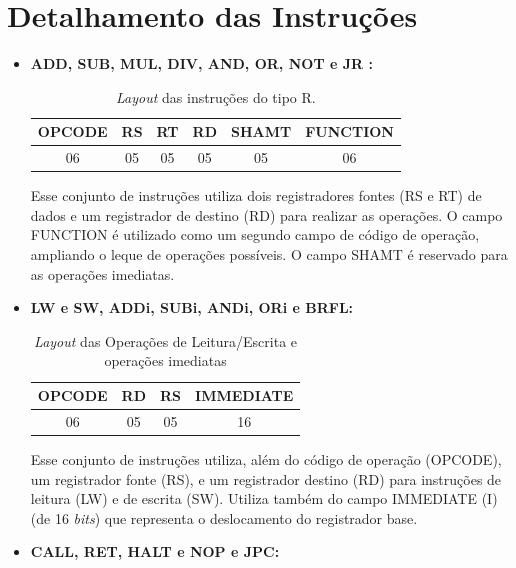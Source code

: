 \documentclass{report}
\begin{document}
  \section{Detalhamento das Instruções}
  
  \begin{itemize}
     
     \item \textbf{ADD, SUB, MUL, DIV, AND, OR, NOT e JR :}

  \begin{table}[H]
\centering
	\begin{tabular}{|c|c|c|c|c|c|}
  	\hline 
  	\textbf{OPCODE} & \textbf{RS} & \textbf{RT} & \textbf{RD} & \textbf{SHAMT} & \textbf{FUNCTION} \\ 
  	\hline 
  	06 & 05 & 05 & 05 & 05 & 06 \\ 
  	\hline 
  	\end{tabular} 
  	\caption{\textit{Layout} das instruções do tipo R.}
  \end{table}
  
  Esse conjunto de instruções utiliza dois registradores fontes (RS e RT) de dados e um registrador de destino (RD) para realizar as operações. O campo FUNCTION é utilizado como um segundo campo de código de operação, ampliando o leque de operações possíveis. O campo SHAMT é reservado para as operações imediatas.\\
  
   \item \textbf{LW e SW, ADDi, SUBi, ANDi, ORi e BRFL:}

  \begin{table}[H]
\centering
	\begin{tabular}{|c|c|c|c|}
  	\hline 
  	\textbf{OPCODE} & \textbf{RD} & \textbf{RS} & \textbf{IMMEDIATE}  \\ 
  	\hline 
  	06 & 05 & 05 & 16 \\ 
  	\hline 
  	\end{tabular} 
  	\caption{\textit{Layout} das Operações de Leitura/Escrita e operações imediatas}
  \end{table}
  
  Esse conjunto de instruções utiliza, além do código de operação (OPCODE), um registrador fonte (RS), e um registrador destino (RD) para instruções de leitura (LW) e de escrita (SW). Utiliza também do campo IMMEDIATE (I) (de 16 \textit{bits}) que representa o deslocamento do registrador base.\\

  
  \item \textbf{CALL, RET, HALT e NOP e JPC:}


\end{itemize}
\end{document}
